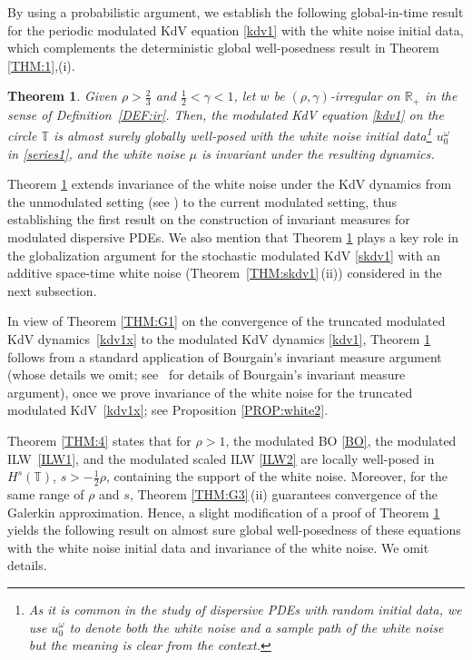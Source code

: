 \documentclass[letterpaper, 11pt,  reqno]{amsart}
\newtheorem{theorem}{Theorem} [section]
\newcommand{\1}{\hspace{0.5mm}\text{I}\hspace{0.5mm}}
\newcommand{\R}{\mathbb{R}}
\newcommand{\T}{\mathbb{T}}
\newcommand{\g}{\gamma}
\renewcommand{\o}{\omega}
\numberwithin{equation}{section}
\numberwithin{theorem}{section}
\begin{document}
By using a probabilistic argument, 
we establish the following global-in-time result
for 
the periodic modulated KdV equation \eqref{kdv1}
with the white noise initial data, 
which complements the deterministic
global well-posedness result in Theorem \ref{THM:1},(i).




\begin{theorem}\label{THM:white1}
Given $\rho > \frac 23 $ and  $\frac12< \g < 1$, 
let  $w$ be $(\rho,\g)$-irregular on $\R_+$ in the sense of Definition~\ref{DEF:ir}.
Then, the modulated KdV equation \eqref{kdv1}
on the circle $\T$
is almost surely globally well-posed
with the white noise initial data\footnote{As it is common
in the study of dispersive PDEs with random initial data, 
we use $u_0^\o$ to denote both the white noise
and a sample path of the white noise but the meaning is clear from the context.}
$u_0^\o$ in \eqref{series1}, 
and the white noise $\mu$ is invariant under the resulting dynamics.


\end{theorem}



Theorem \ref{THM:white1}
extends 
invariance of the white noise under the KdV dynamics
from the unmodulated setting (see \cite{QV, Oh1, Oh2, Oh10, OQV, KMV})
to the current modulated setting, 
thus establishing the first result 
on the construction of invariant measures
for modulated dispersive PDEs.
We also mention 
that 
Theorem \ref{THM:white1}
plays a key role in the globalization
argument for
the stochastic modulated KdV \eqref{skdv1}
with an additive space-time white noise
 (Theorem~\ref{THM:skdv1}\,(ii))
 considered in the next subsection.

In view of 
Theorem \ref{THM:G1} on 
the convergence of the truncated modulated KdV dynamics~\eqref{kdv1x}
to the modulated KdV dynamics \eqref{kdv1}, 
Theorem \ref{THM:white1}
follows from a standard application of 
 Bourgain's invariant measure argument \cite{BO94, BO96}
(whose details we omit; see~\cite{BT1} for 
details of  Bourgain's invariant measure argument), 
once we prove invariance of the white noise
for the truncated modulated KdV~\eqref{kdv1x}; see Proposition \ref{PROP:white2}.




Theorem \ref{THM:4}
states that 
for $\rho > 1$, 
 the modulated BO \eqref{BO}, 
the modulated ILW~\eqref{ILW1}, 
and the modulated scaled ILW \eqref{ILW2}
are locally well-posed 
in $H^s(\T)$, $s > -\frac 12 \rho$, 
containing the support of the white noise.
Moreover, 
for the same range of $\rho$ and $s$, 
Theorem \ref{THM:G3}\,(ii)
guarantees convergence of the Galerkin approximation.
Hence,
a slight modification of a proof of Theorem \ref{THM:white1}
yields
 the following result
on almost sure global well-posedness
of these equations with the white noise initial data
and invariance of the white noise.
We omit details.
\end{document}
